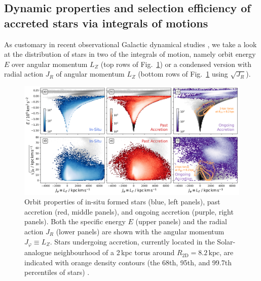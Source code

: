 \documentclass[fleqn,usenatbib]{mnras}
\begin{document}
\subsection{Dynamic properties and selection efficiency of accreted stars via integrals of motions} \label{sec:analysis_dynamic_properties}

As customary in recent observational Galactic dynamical studies \citep[for example][]{Helmi2018, Trick2019, Helmi2020, Buder2022}, we take a look at the distribution of stars in two of the integrals of motion, namely orbit energy $E$ over angular momentum $L_Z$ (top rows of Fig.~\ref{fig:lz_e_jr}) or a condensed version with radial action $J_R$ of angular momentum $L_Z$ (bottom rows of Fig.~\ref{fig:lz_e_jr} using $\sqrt{J_R}$).

\begin{figure}
    \centering
    \includegraphics[width=\textwidth]{figures/lz_e_jr.png}
    \caption{Orbit properties of in-situ formed stars (blue, left panels), past accretion (red, middle panels), and ongoing accretion (purple, right panels). Both the specific energy $E$ (upper panels) and the radial action $J_R$ (lower panels) are shown with the angular momentum $J_\varphi \equiv L_Z$. Stars undergoing accretion, currently located in the Solar-analogue neighbourhood of a 2\,kpc torus around $R_\mathrm{2D} = 8.2\,\mathrm{kpc}$, are indicated with orange density contours (the 68th, 95th, and 99.7th percentiles of stars) \href{https://github.com/svenbuder/gse_nihaouhd/tree/main/figures}{\faGithub}.
    \label{fig:lz_e_jr}}
\end{figure}
\end{document}
